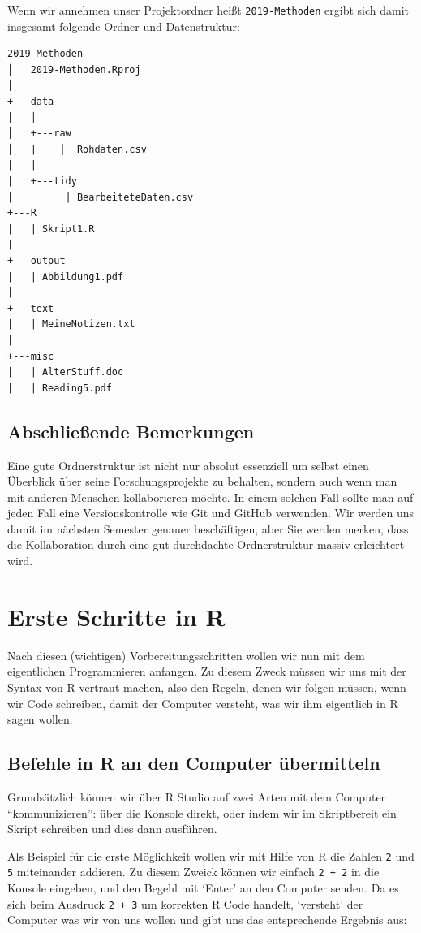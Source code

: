 \documentclass[]{book}
\begin{document}
Wenn wir annehmen unser Projektordner heißt \texttt{2019-Methoden}
ergibt sich damit insgesamt folgende Ordner und Datenstruktur:

\begin{verbatim}
2019-Methoden
│   2019-Methoden.Rproj
│
+---data
│   │
│   +---raw
│   |    │  Rohdaten.csv
|   |
|   +---tidy
|         | BearbeiteteDaten.csv
+---R
|   | Skript1.R
|
+---output
|   | Abbildung1.pdf
|
+---text
|   | MeineNotizen.txt
|
+---misc
|   | AlterStuff.doc
|   | Reading5.pdf
\end{verbatim}

\section{Abschließende Bemerkungen}\label{abschlieende-bemerkungen}

Eine gute Ordnerstruktur ist nicht nur absolut essenziell um selbst
einen Überblick über seine Forschungsprojekte zu behalten, sondern auch
wenn man mit anderen Menschen kollaborieren möchte. In einem solchen
Fall sollte man auf jeden Fall eine Versionskontrolle wie Git und GitHub
verwenden. Wir werden uns damit im nächsten Semester genauer
beschäftigen, aber Sie werden merken, dass die Kollaboration durch eine
gut durchdachte Ordnerstruktur massiv erleichtert wird.

\chapter{Erste Schritte in R}\label{basics}

Nach diesen (wichtigen) Vorbereitungsschritten wollen wir nun mit dem
eigentlichen Programmieren anfangen. Zu diesem Zweck müssen wir uns mit
der Syntax von R vertraut machen, also den Regeln, denen wir folgen
müssen, wenn wir Code schreiben, damit der Computer versteht, was wir
ihm eigentlich in R sagen wollen.

\section{Befehle in R an den Computer
übermitteln}\label{befehle-in-r-an-den-computer-ubermitteln}

Grundsätzlich können wir über R Studio auf zwei Arten mit dem Computer
``kommunizieren'': über die Konsole direkt, oder indem wir im
Skriptbereit ein Skript schreiben und dies dann ausführen.

Als Beispiel für die erste Möglichkeit wollen wir mit Hilfe von R die
Zahlen \texttt{2} und \texttt{5} miteinander addieren. Zu diesem Zweick
können wir einfach \texttt{2\ +\ 2} in die Konsole eingeben, und den
Begehl mit `Enter' an den Computer senden. Da es sich beim Ausdruck
\texttt{2\ +\ 3} um korrekten R Code handelt, `versteht' der Computer
was wir von uns wollen und gibt uns das entsprechende Ergebnis aus:
\end{document}
